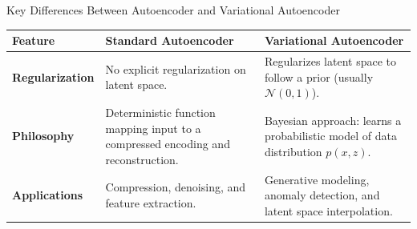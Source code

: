 \documentclass{beamer}
\begin{document}
\begin{frame}{Key Differences Between Autoencoder and Variational Autoencoder}

\begin{table}[ht]
\centering
\scriptsize %
\renewcommand{\arraystretch}{1.5} %
\begin{tabular}{|p{}|p{}|p{}|}
\hline
\rowcolor{blue!20} \textbf{Feature} & \textbf{Standard Autoencoder} & \textbf{Variational Autoencoder} \\ \hline

\textbf{Regularization} & No explicit regularization on latent space. & Regularizes latent space to follow a prior (usually \( \mathcal{N}(0,1) \)). \\ \hline

\rowcolor{blue!10} \textbf{Philosophy} & Deterministic function mapping input to a compressed encoding and reconstruction. & Bayesian approach: learns a probabilistic model of data distribution \( p(x,z) \). \\ \hline

\textbf{Applications} & Compression, denoising, and feature extraction. & Generative modeling, anomaly detection, and latent space interpolation. \\ \hline
\end{tabular}
\end{table}

\end{frame}
\end{document}
